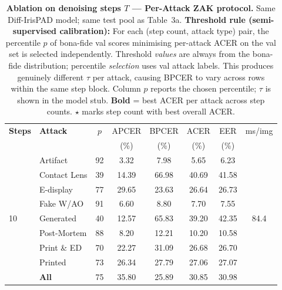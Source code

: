 \documentclass{article}
\begin{document}
\begin{table}[!htbp]
\centering
\scriptsize
\setlength{\tabcolsep}{3pt}
\caption{%
  \textbf{Ablation on denoising steps $T$ — Per-Attack ZAK protocol.}
  Same Diff-IrisPAD model; same test pool as Table~3a.
  \textbf{Threshold rule (semi-supervised calibration):}
  For each (step count, attack type) pair, the percentile $p$ of bona-fide
  val scores minimising per-attack ACER on the val set is selected
  independently. Threshold \emph{values} are always from the bona-fide
  distribution; percentile \emph{selection} uses val attack labels.
  This produces genuinely different $\tau$ per attack, causing BPCER to
  vary across rows within the same step block.
  Column $p$ reports the chosen percentile; $\tau$ is shown in the model
  stub.
  \textbf{Bold} = best ACER per attack across step counts.
  $\star$ marks step count with best overall ACER.}
\label{tab:ablation_perattack_zak}

\begin{tabular}{l l c c c c c c}
\toprule
\textbf{Steps} & \textbf{Attack} & $p$ & APCER & BPCER & ACER & EER & ms/img \\
               &                 &     & (\%)  & (\%)  & (\%) & (\%) & \\
\midrule

\multirow{9}{*}{10}
& Artifact          & 92 &   3.32 &  7.98 &           5.65 &  6.23 & \multirow{9}{*}{84.4} \\
& Contact Lens      & 39 &  14.39 & 66.98 &          40.69 & 41.58 & \\
& E-display         & 77 &  29.65 & 23.63 &          26.64 & 26.73 & \\
& Fake W/AO         & 91 &   6.60 &  8.80 &           7.70 &  7.55 & \\
& Generated         & 40 &  12.57 & 65.83 &          39.20 & 42.35 & \\
& Post-Mortem       & 88 &   8.20 & 12.21 &          10.20 & 10.58 & \\
& Print \& ED       & 70 &  22.27 & 31.09 &          26.68 & 26.70 & \\
& Printed           & 73 &  26.34 & 27.79 &          27.06 & 27.07 & \\
\cmidrule(lr){2-7}
& \textbf{All}      & 75 &  35.80 & 25.89 &          30.85 & 30.98 & \\
\midrule


\end{tabular}
\end{table}
\end{document}
